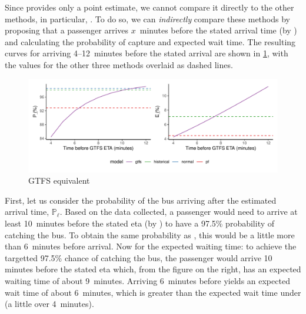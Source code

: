 Since \Fsched{} provides only a point estimate, we cannot compare it directly to the other methods, in particular, \Fpf{}. To do so, we can \emph{indirectly} compare these methods by proposing that a passenger arrives $x$~minutes before the stated arrival time (by \Fsched{}) and calculating the probability of capture and expected wait time. The resulting curves for arriving 4--12~minutes before the stated arrival are shown in \cref{fig:model_results_pr_gtfs}, with the values for the other three methods overlaid as dashed lines.


\begin{knitrout}\small
{}\color{fgcolor}\begin{figure}

{\centering \includegraphics[width=\textwidth]{figure/model_results_pr_gtfs-1} 

}

\caption[GTFS equivalent]{GTFS equivalent}\label{fig:model_results_pr_gtfs}
\end{figure}


\end{knitrout}



First, let us consider the probability of the bus arriving after the estimated arrival time, $\mathbb{P}_\ell$. Based on the data collected, a passenger would need to arrive at least 10~minutes before the stated \gls{eta} (by \Fsched{}) to have a 97.5\% probability of catching the bus. To obtain the same probability as \Fpf{}, this would be a little more than 6~minutes before arrival. Now for the expected waiting time: to achieve the targetted 97.5\% chance of catching the bus, the passenger would arrive 10 minutes before the stated \gls{eta} which, from the figure on the right, has an expected waiting time of about 9~minutes. Arriving 6~minutes before yields an expected wait time of about 6~minutes, which is greater than the expected wait time under \Fpf{} (a little over 4~minutes).



